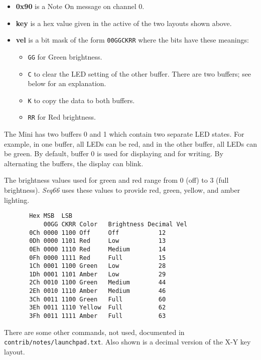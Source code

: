    \begin{itemize}
      \item \textbf{0x90}
         is a Note On message on channel 0.
      \item \textbf{key} is a hex value given in the active of the
         two layouts shown above.
      \item \textbf{vel} is a bit mask of the form \texttt{00GGCKRR} where the
         bits have these meanings:
         \begin{itemize}
            \item \texttt{GG} for Green brightness.
            \item \texttt{C} to clear the LED setting of the other buffer.
               There are two buffers; see below for an explanation.
            \item \texttt{K} to copy the data to both buffers.
            \item \texttt{RR} for Red brightness.
         \end{itemize}
   \end{itemize}

   The Mini has two buffers 0 and 1 which contain two separate LED states. For
   example, in one buffer, all LEDs can be red, and in the other buffer, all LEDs
   can be green.  By default, buffer 0 is used for displaying and for writing.
   By alternating the buffers, the display can blink.

   The brightness values used for green and red range from 0 (off) to 3 (full
   brightness).  \textsl{Seq66} uses these values to provide red, green, yellow,
   and amber lighting.

   \begin{verbatim}
       Hex MSB  LSB
           00GG CKRR Color   Brightness Decimal Vel
       0Ch 0000 1100 Off     Off           12
       0Dh 0000 1101 Red     Low           13
       0Eh 0000 1110 Red     Medium        14
       0Fh 0000 1111 Red     Full          15
       1Ch 0001 1100 Green   Low           28
       1Dh 0001 1101 Amber   Low           29
       2Ch 0010 1100 Green   Medium        44
       2Eh 0010 1110 Amber   Medium        46
       3Ch 0011 1100 Green   Full          60
       3Eh 0011 1110 Yellow  Full          62
       3Fh 0011 1111 Amber   Full          63
   \end{verbatim}

   There are some other commands, not used, documented in
   \texttt{contrib/notes/launchpad.txt}.
   Also shown is a decimal version of the X-Y key layout.

